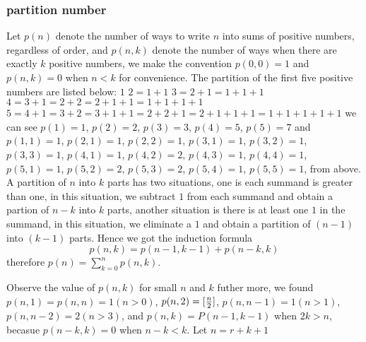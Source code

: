 \subsubsection{partition number}
Let $p(n)$ denote the number of ways to write
$n$ into sums of positive numbers, regardless
of order, and $p(n,k)$ denote the number of ways
when there are exactly $k$ positive numbers,
we make the convention $p(0,0)=1$ and $p(n,k)=0$
when $n < k$ for convenience. The partition of
the first five positive numbers are listed below:
\newline
$1$	\newline
$2 = 1 + 1$	\newline
$3 = 2 + 1 = 1 + 1 + 1$	\newline
$4 = 3 + 1 = 2 + 2 = 2 + 1 + 1 = 1 + 1 + 1 + 1$	\newline
$5 = 4 + 1 = 3 + 2 = 3 + 1 + 1 = 2 + 2 + 1 = 2 + 1 + 1 + 1 = 1 + 1 + 1 + 1 + 1$	\newline
we can see $p(1)=1$, $p(2)=2$, $p(3)=3$, $p(4)=5$, $p(5)=7$
and \newline
$p(1,1)=1$,	\newline
$p(2,1)=1$, $p(2,2)=1$,	\newline
$p(3,1)=1$, $p(3,2)=1$, $p(3,3)=1$,	\newline
$p(4,1)=1$, $p(4,2)=2$, $p(4,3)=1$, $p(4,4)=1$,	\newline
$p(5,1)=1$, $p(5,2)=2$, $p(5,3)=2$, $p(5,4)=1$, $p(5,5)=1$,	\newline
from above. A partition of $n$ into $k$ parts has
two situations, one is each summand is greater than one,
in this situation, we subtract $1$ from each summand
and obtain a partion of $n-k$ into $k$ parts,
another situation is there is at least one $1$ in
the summand, in this situation, we eliminate a $1$
and obtain a partition of $(n-1)$ into $(k-1)$ parts.
Hence we got the induction formula
$$p(n,k)=p(n-1,k-1) + p(n-k,k)$$
therefore $p(n)=\sum_{k=0}^n p(n,k)$.

Observe the value of $p(n,k)$ for small $n$ and $k$
futher more, we found $p(n,1)=p(n,n)=1(n > 0)$, $p(n,2)=[{n \over 2}]$,
$p(n,n-1)=1(n > 1)$, $p(n,n-2)=2(n>3)$,
and $p(n,k)=P(n-1,k-1)$ when $2k>n$, becasue $p(n-k,k)=0$ when $n-k<k$.
Let $n=r+k+1$

